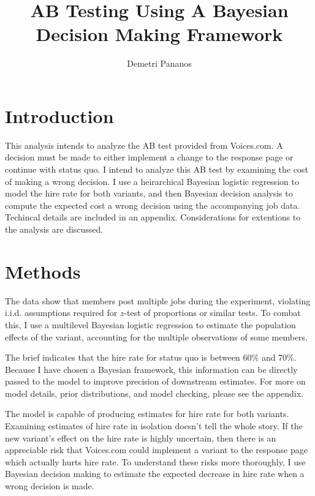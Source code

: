\documentclass[]{article}
\title{AB Testing Using A Bayesian Decision Making Framework}
\author{Demetri Pananos}
\date{}
\begin{document}
\maketitle

\hypertarget{introduction}{%
\section{Introduction}\label{introduction}}

This analysis intends to analyze the AB test provided from Voices.com. A
decision must be made to either implement a change to the response page
or continue with status quo. I intend to analyze this AB test by
examining the cost of making a wrong decision. I use a heirarchical
Bayesian logistic regression to model the hire rate for both variants,
and then Bayesian decision analysis to compute the expected cost a wrong
decision using the accompanying job data. Techincal details are included
in an appendix. Considerations for extentions to the analysis are
discussed.

\hypertarget{methods}{%
\section{Methods}\label{methods}}

The data show that members post multiple jobs during the experiment,
violating i.i.d. assumptions required for \(z\)-test of proportions or
similar tests. To combat this, I use a multilevel Bayesian logistic
regression to estimate the population effects of the variant, accounting
for the multiple observations of some members.

The brief indicates that the hire rate for status quo is between 60\%
and 70\%. Because I have chosen a Bayesian framework, this information
can be directly passed to the model to improve precision of downstream
estimates. For more on model details, prior distributions, and model
checking, please see the appendix.

The model is capable of producing estimates for hire rate for both
variants. Examining estimates of hire rate in isolation doesn't tell the
whole story. If the new variant's effect on the hire rate is highly
uncertain, then there is an appreciable risk that Voices.com could
implement a variant to the response page which actually hurts hire rate.
To understand these risks more thoroughly, I use Bayesian decision
making to estimate the expected decrease in hire rate when a wrong
decision is made.
\end{document}
